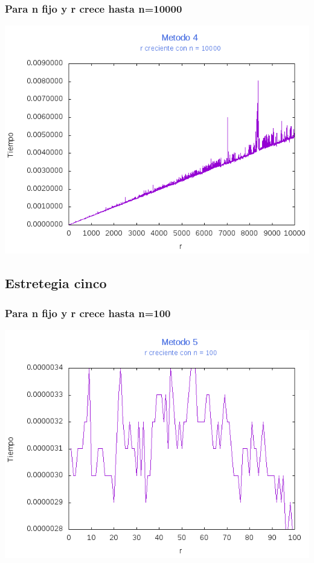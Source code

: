 \documentclass[12pt,letterpaper]{scrartcl}
\begin{document}
\subsubsection{Para n fijo y r crece hasta n=10000}
\includegraphics[scale=1]{Metodo4/plot10000m4}
\newpage
\subsection{Estretegia cinco}

\subsubsection{Para n fijo y r crece hasta n=100}
\includegraphics[scale=1]{Metodo5/plot100m5}
\end{document}
